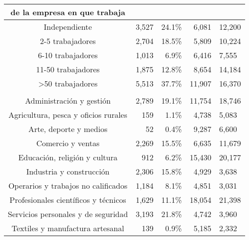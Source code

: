 \begin{table}[t]
\begin{tabular*}{\linewidth}{@{\extracolsep{\fill}}crrrl}
{{de la empresa en que trabaja}} \\[2.5pt] 
\midrule\addlinespace[2.5pt]
Independiente & 3,527 & 24.1\% &  6,081 & 12,200 \\ 
2-5 trabajadores & 2,704 & 18.5\% &  5,809 & 10,224 \\ 
6-10 trabajadores & 1,013 &  6.9\% &  6,416 &  7,555 \\ 
11-50 trabajadores & 1,875 & 12.8\% &  8,654 & 14,184 \\ 
>50 trabajadores & 5,513 & 37.7\% & 11,907 & 16,370 \\ 
\midrule\addlinespace[2.5pt]
\multicolumn{5}{l}{{\bfseries Oficio}} \\[2.5pt] 
\midrule\addlinespace[2.5pt]
Administración y gestión & 2,789 & 19.1\% & 11,754 & 18,746 \\ 
Agricultura, pesca y oficios rurales &   159 &  1.1\% &  4,738 &  5,083 \\ 
Arte, deporte y medios &    52 &  0.4\% &  9,287 &  6,600 \\ 
Comercio y ventas & 2,269 & 15.5\% &  6,635 & 11,679 \\ 
Educación, religión y cultura &   912 &  6.2\% & 15,430 & 20,177 \\ 
Industria y construcción & 2,306 & 15.8\% &  4,929 &  3,638 \\ 
Operarios y trabajos no calificados & 1,184 &  8.1\% &  4,851 &  3,031 \\ 
Profesionales científicos y técnicos & 1,629 & 11.1\% & 18,054 & 21,398 \\ 
Servicios personales y de seguridad & 3,193 & 21.8\% &  4,742 &  3,960 \\ 
Textiles y manufactura artesanal &   139 &  0.9\% &  5,185 &  2,332 \\ 
\bottomrule
\end{tabular*}
\end{table}

